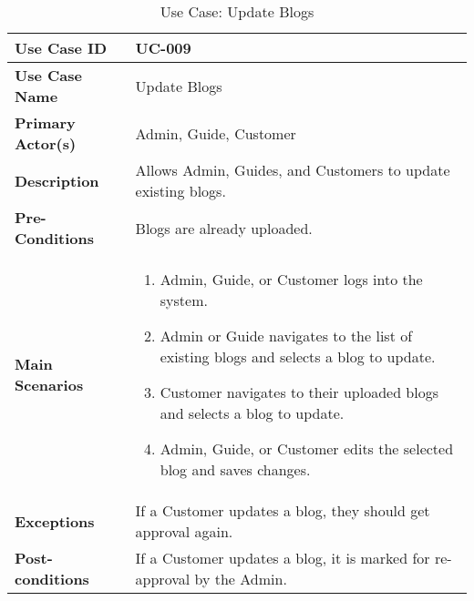 \begin{table}[ht]
    \centering
    \begin{tabular}{|l|p{}|}
        \hline
        \textbf{Use Case ID} & UC-009 \\
        \hline
        \textbf{Use Case Name} & Update Blogs \\
        \hline
        \textbf{Primary Actor(s)} & Admin, Guide, Customer \\
        \hline
        \textbf{Description} & Allows Admin, Guides, and Customers to update existing blogs. \\
        \hline
        \textbf{Pre-Conditions} & Blogs are already uploaded. \\
        \hline
        \textbf{Main Scenarios} & 
        \begin{enumerate}[label=\arabic*.,itemsep=0pt]
            \item Admin, Guide, or Customer logs into the system.
            \item Admin or Guide navigates to the list of existing blogs and selects a blog to update.
            \item Customer navigates to their uploaded blogs and selects a blog to update.
            \item Admin, Guide, or Customer edits the selected blog and saves changes.
        \end{enumerate} \\
        \hline
        \textbf{Exceptions} & If a Customer updates a blog, they should get approval again. \\
        \hline
        \textbf{Post-conditions} & If a Customer updates a blog, it is marked for re-approval by the Admin. \\
        \hline
    \end{tabular}
    \label{tab:use-case-update-blogs}
    \caption{Use Case: Update Blogs}
\end{table}



